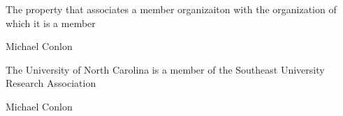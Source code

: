 \documentclass[letterpaper,10pt,english]{sphinxmanual}
\begin{document}
\begin{sphinxShadowBox}

\sphinxAtStartPar
{}
\end{sphinxShadowBox}

\begin{sphinxShadowBox}

\sphinxAtStartPar
The property that associates a member organizaiton with the organization of which it is a member
\end{sphinxShadowBox}

\begin{sphinxShadowBox}

\sphinxAtStartPar
Michael Conlon 
\end{sphinxShadowBox}

\begin{sphinxShadowBox}

\sphinxAtStartPar
{\hyperref[\detokenize{doc-ORG_0000001::doc}]{}}
\end{sphinxShadowBox}

\begin{sphinxShadowBox}

\sphinxAtStartPar
{\hyperref[\detokenize{doc-ORG_0000001::doc}]{}}
\end{sphinxShadowBox}

\begin{sphinxShadowBox}

\sphinxAtStartPar
The University of North Carolina is a member of the Southeast University Research Association
\end{sphinxShadowBox}

\begin{sphinxShadowBox}

\sphinxAtStartPar
Michael Conlon 
\end{sphinxShadowBox}
\begin{quote}

\ignorespaces \end{quote}
\end{document}
